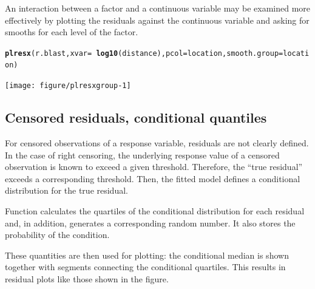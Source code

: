 \documentclass[11pt]{article}\usepackage[]{graphicx}\usepackage[]{color}
\makeatletter
\newcommand{\hlopt}[1]{\textcolor[rgb]{0,0,0}{#1}}%
\newcommand{\hlstd}[1]{\textcolor[rgb]{0.345,0.345,0.345}{#1}}%
\newcommand{\hlkwc}[1]{\textcolor[rgb]{0.333,0.667,0.333}{#1}}%
\newcommand{\hlkwd}[1]{\textcolor[rgb]{0.737,0.353,0.396}{\textbf{#1}}}%
\newenvironment{kframe}{%
 \def\at@end@of@kframe{}%
 \ifinner\ifhmode%
  \def\at@end@of@kframe{\end{minipage}}%
  \begin{minipage}{\columnwidth}%
 \fi\fi%
 \def\FrameCommand##1{\hskip\@totalleftmargin \hskip-\fboxsep
 \colorbox{shadecolor}{##1}\hskip-\fboxsep
     \hskip-\linewidth \hskip-\@totalleftmargin \hskip\columnwidth}%
 \MakeFramed {\advance\hsize-\width
   \@totalleftmargin\z@ \linewidth\hsize
   \@setminipage}}%
 {\par\unskip\endMakeFramed%
 \at@end@of@kframe}
\newenvironment{knitrout}{}{} %
\makeatother
\begin{document}
An interaction between a factor and a continuous variable may be examined
more effectively by plotting the residuals against the continuous variable
and asking for smooths for each level of the factor.

\begin{knitrout}
\color{fgcolor}\begin{kframe}
\begin{alltt}
\hlkwd{plresx}\hlstd{(r.blast,} \hlkwc{xvar}\hlstd{=}\hlopt{~} \hlkwd{log10}\hlstd{(distance),} \hlkwc{pcol}\hlstd{=location,} \hlkwc{smooth.group}\hlstd{=location)}
\end{alltt}


{\ttfamily\noindent\itshape\color{messagecolor}{\#\# ..gensmooth: too few observations for a 'high' smooth for group\ \ 7}}

{\ttfamily\noindent\itshape\color{messagecolor}{\#\# ..gensmooth: too few observations for a 'low' smooth for group\ \ 7}}\end{kframe}
\texttt{[image: figure/plresxgroup-1]} 

\end{knitrout}

\subsection{Censored residuals, conditional quantiles}

For censored observations of a response variable, residuals are not 
clearly defined.
In the case of right censoring, the underlying response value of a censored
observation is known to exceed a given threshold. Therefore, the 
``true residual'' exceeds a corresponding threshold.
Then, the fitted model defines a conditional distribution for the true residual.


Function  calculates the quartiles of the conditional
distribution for each residual and, in addition, generates a corresponding
random number. It also stores the probability of the condition.

These quantities are then used for plotting: the conditional median is 
shown together with segments connecting the conditional quartiles.
This results in residual plots like those shown in the figure.
\end{document}
